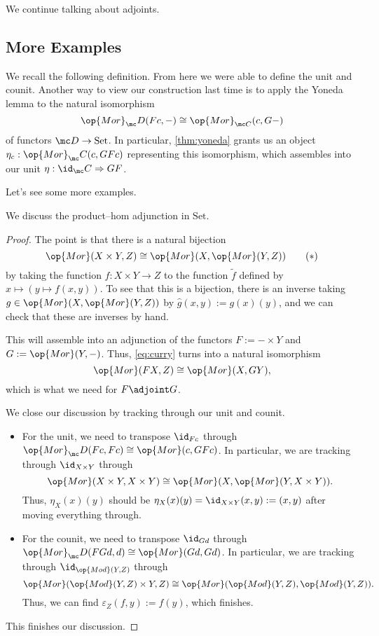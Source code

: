 \documentclass[../notes.tex]{subfiles}
\begin{document}

We continue talking about adjoints.

\subsection{More Examples}
We recall the following definition.
\adjdefi*
\noindent From here we were able to define the unit and counit. Another way to view our construction last time is to apply the Yoneda lemma to the natural isomorphism
\[\op{Mor}_\mc D(Fc,-)\cong\op{Mor}_{\mc C}(c,G-)\]
of functors $\mc D\to\mathrm{Set}$. In particular, \autoref{thm:yoneda} grants us an object $\eta_c:\op{Mor}_\mc C(c,GFc)$ representing this isomorphism, which assembles into our unit $\eta:\id_\mc C\Rightarrow GF$.

Let's see some more examples.
\begin{exe}
	We discuss the product--hom adjunction in $\mathrm{Set}$.
\end{exe}
\begin{proof}
	The point is that there is a natural bijection
	\[\op{Mor}(X\times Y,Z)\cong\op{Mor}(X,\op{Mor}(Y,Z))\label{eq:curry}\tag{$*$}\]
	by taking the function $f:X\times Y\to Z$ to the function $\widetilde f$ defined by $x\mapsto(y\mapsto f(x,y))$. To see that this is a bijection, there is an inverse taking $g\in\op{Mor}(X,\op{Mor}(Y,Z))$ by $\hat g(x,y):=g(x)(y)$, and we can check that these are inverses by hand.
	
	This will assemble into an adjunction of the functors $F:=-\times Y$ and $G:=\op{Mor}(Y,-)$. Thus, \autoref{eq:curry} turns into a natural isomorphism
	\[\op{Mor}(FX,Z)\cong\op{Mor}(X,GY),\]
	which is what we need for $F\adjoint G$.

	We close our discussion by tracking through our unit and counit.
	\begin{itemize}
		\item For the unit, we need to transpose $\id_{Fc}$ through $\op{Mor}_\mc D(Fc,Fc)\cong\op{Mor}(c,GFc)$. In particular, we are tracking through $\id_{X\times Y}$ through
		\[\op{Mor}(X\times Y,X\times Y)\cong\op{Mor}(X,\op{Mor}(Y,X\times Y)).\]
		Thus, $\eta_X(x)(y)$ should be $\eta_X(x)(y)=\id_{X\times Y}(x,y):=(x,y)$ after moving everything through.
		\item For the counit, we need to transpose $\id_{Gd}$ through $\op{Mor}_\mc D(FGd,d)\cong\op{Mor}(Gd,Gd)$. In particular, we are tracking through $\id_{\op{Mod}(Y,Z)}$ through
		\[\op{Mor}(\op{Mod}(Y,Z)\times Y,Z)\cong\op{Mor}(\op{Mod}(Y,Z),\op{Mod}(Y,Z)).\]
		Thus, we can find $\varepsilon_Z(f,y):=f(y)$, which finishes.
	\end{itemize}
	This finishes our discussion.
\end{proof}
\end{document}
